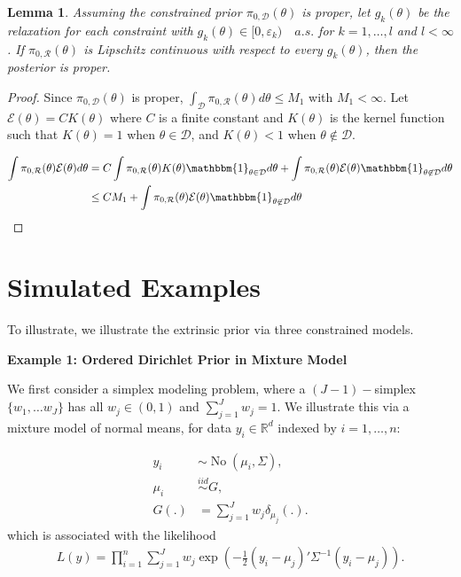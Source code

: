 \documentclass[10pt]{article}
\newtheorem{lemma}{Lemma}
\newcommand{\bb}[1]{\mathbb{#1}}
\newcommand{\mc}[1]{\mathcal{#1}}
\DeclareMathOperator{\No}{No}
\DeclareMathOperator{\1}{\mathbbm{1}}
\begin{document}
\begin{lemma}
Assuming the constrained prior $\pi_{0,\mc D}(\theta)$ is proper, let $g_k(\theta)$ be the relaxation for each constraint with $g_k(\theta)\in[0,\varepsilon_k) \quad a.s.$ for $k=1,\ldots, l$ and $l<\infty$. If $\pi_{0,\mc R}(\theta)$ is Lipschitz continuous with respect to every $g_k(\theta)$, then the posterior is proper.
\end{lemma}

\begin{proof}

Since $\pi_{0,\mc D}(\theta)$ is proper, ${ \int_{\mc D}  \pi_{0,\mc R}(\theta)d\theta } \le M_1$ with $M_1<\infty$. Let $\mc E(\theta)= C K(\theta)$ where $C$ is a finite constant and $K(\theta)$ is the kernel function such that $K(\theta)=1$ when $\theta\in\mc D$, and $K(\theta)<1$ when $\theta\not\in\mc D$.

\begin{equation*}
\begin{aligned}
\int \pi_{0,\mc R}(\theta) \mc E(\theta) d\theta 
&=C\int  \pi_{0,\mc R}(\theta)K(\theta) \mathbbm{1}_{\theta\in \mc D} d\theta
+ \int  \pi_{0,\mc R}(\theta)\mc E(\theta) \mathbbm{1}_{\theta\not\in \mc D} d\theta \\
&\le CM_1 + \int \pi_{0,\mc R}(\theta)\mc E(\theta) \mathbbm{1}_{\theta\not\in \mc D} d\theta
\end{aligned}
\end{equation*}
\end{proof}


\section{Simulated Examples}

To illustrate, we illustrate the extrinsic prior via three constrained models.

{\bf Example 1: Ordered Dirichlet Prior in Mixture Model}

We first consider a simplex modeling problem, where a $(J-1)-$simplex $\{w_1,\ldots w_J\}$ has all $w_j\in (0,1)$ and $\sum_{j=1}^J w_j=1$. We illustrate this via a mixture model of normal means, for data $y_i\in \bb R^d$ indexed by $i=1,\ldots,n$:

\begin{equation*}
\begin{aligned}
y_i &\sim \No(\mu_i,\Sigma),\\
\mu_i &\stackrel{iid}{\sim} G,\\
G(.) & = \sum_{j=1}^{J} w_j \delta_{\mu_j}(.).
\end{aligned}
\end{equation*}
which is associated with the likelihood
\begin{equation*}
\begin{aligned}
L(y) = \prod_{i=1}^n \sum_{j=1}^{J} w_j \exp\left(-\frac{1}{2}{ (y_i-\mu_j)'\Sigma^{-1}(y_i-\mu_j)}\right).
\end{aligned}
\end{equation*}
\end{document}
